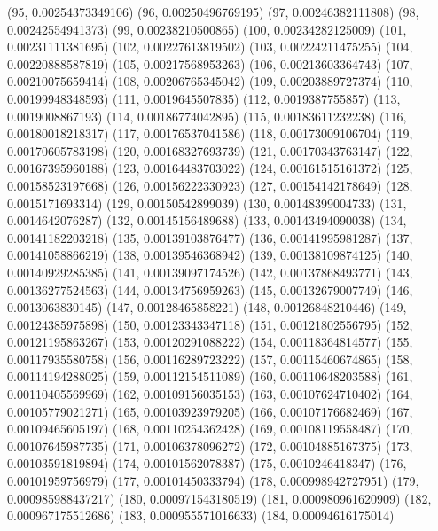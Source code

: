 {					(95, 0.00254373349106)
					(96, 0.00250496769195)
					(97, 0.00246382111808)
					(98, 0.00242554941373)
					(99, 0.00238210500865)
					(100, 0.00234282125009)
					(101, 0.00231111381695)
					(102, 0.00227613819502)
					(103, 0.00224211475255)
					(104, 0.00220888587819)
					(105, 0.00217568953263)
					(106, 0.00213603364743)
					(107, 0.00210075659414)
					(108, 0.00206765345042)
					(109, 0.00203889727374)
					(110, 0.00199948348593)
					(111, 0.0019645507835)
					(112, 0.0019387755857)
					(113, 0.0019008867193)
					(114, 0.00186774042895)
					(115, 0.00183611232238)
					(116, 0.00180018218317)
					(117, 0.00176537041586)
					(118, 0.00173009106704)
					(119, 0.00170605783198)
					(120, 0.00168327693739)
					(121, 0.00170343763147)
					(122, 0.00167395960188)
					(123, 0.00164483703022)
					(124, 0.00161515161372)
					(125, 0.00158523197668)
					(126, 0.00156222330923)
					(127, 0.00154142178649)
					(128, 0.0015171693314)
					(129, 0.00150542899039)
					(130, 0.00148399004733)
					(131, 0.0014642076287)
					(132, 0.00145156489688)
					(133, 0.00143494090038)
					(134, 0.00141182203218)
					(135, 0.00139103876477)
					(136, 0.00141995981287)
					(137, 0.00141058866219)
					(138, 0.00139546368942)
					(139, 0.00138109874125)
					(140, 0.00140929285385)
					(141, 0.00139097174526)
					(142, 0.00137868493771)
					(143, 0.00136277524563)
					(144, 0.00134756959263)
					(145, 0.00132679007749)
					(146, 0.0013063830145)
					(147, 0.00128465858221)
					(148, 0.00126848210446)
					(149, 0.00124385975898)
					(150, 0.00123343347118)
					(151, 0.00121802556795)
					(152, 0.00121195863267)
					(153, 0.00120291088222)
					(154, 0.00118364814577)
					(155, 0.00117935580758)
					(156, 0.00116289723222)
					(157, 0.00115460674865)
					(158, 0.00114194288025)
					(159, 0.00112154511089)
					(160, 0.00110648203588)
					(161, 0.00110405569969)
					(162, 0.00109156035153)
					(163, 0.00107624710402)
					(164, 0.00105779021271)
					(165, 0.00103923979205)
					(166, 0.00107176682469)
					(167, 0.00109465605197)
					(168, 0.00110254362428)
					(169, 0.00108119558487)
					(170, 0.00107645987735)
					(171, 0.00106378096272)
					(172, 0.00104885167375)
					(173, 0.00103591819894)
					(174, 0.00101562078387)
					(175, 0.0010246418347)
					(176, 0.00101959756979)
					(177, 0.00101450333794)
					(178, 0.000998942727951)
					(179, 0.000985988437217)
					(180, 0.000971543180519)
					(181, 0.000980961620909)
					(182, 0.000967175512686)
					(183, 0.000955571016633)
					(184, 0.00094616175014)
}

